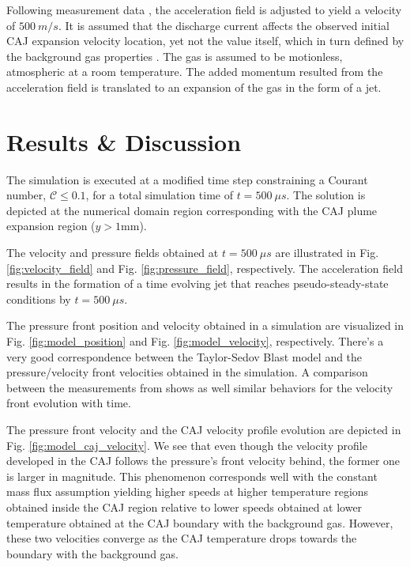 \documentclass[a4paper]{iacas}%
\begin{document}
Following measurement data \cite{KRClose}, the acceleration field is adjusted to yield a velocity of $500~ m/s$. It is assumed that the discharge current affects the observed initial CAJ expansion velocity location, yet not the value itself, which in turn defined by the background gas properties \cite{KR,KRClose,KRFar}. The gas is assumed to be motionless, atmospheric at a room temperature. The added momentum resulted from the acceleration field is translated to an expansion of the gas in the form of a jet.

\section{Results \& Discussion}

The simulation is executed at a modified time step  constraining a Courant number, $\mathcal{C} \leq 0.1$, for a total simulation time of $t = 500~\mu s$. The solution is depicted at the numerical domain region corresponding with the CAJ plume expansion region ($ y > 1 \mathrm{mm} $). 

The velocity and pressure fields obtained at $ t = 500~\mu s $ are illustrated in Fig. \ref{fig:velocity_field} and Fig. \ref{fig:pressure_field}, respectively. The acceleration field results in the formation of a time evolving jet that reaches pseudo-steady-state conditions by $t = 500~\mu s$.

The pressure front position and velocity obtained in a simulation are visualized in Fig. \ref{fig:model_position} and Fig. \ref{fig:model_velocity}, respectively. There's a very good correspondence between the Taylor-Sedov \cite{TAYLOR,SEDOV} Blast model and the pressure/velocity front velocities obtained in the simulation. A comparison between the measurements from \cite{KR} shows as well similar behaviors for the velocity front evolution with time.

The pressure front velocity and the CAJ velocity profile evolution are depicted in Fig. \ref{fig:model_caj_velocity}. We see that even though the velocity profile developed in the CAJ  follows the pressure's front velocity behind, the former one is larger in magnitude. This phenomenon corresponds well with the constant mass flux assumption yielding higher speeds at higher temperature regions obtained inside the CAJ region relative to lower speeds obtained at lower temperature obtained at the CAJ boundary with the background gas. However, these two velocities converge as the CAJ temperature drops towards the boundary with the background gas. 
\end{document}
